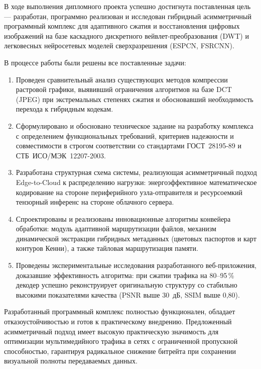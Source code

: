
В ходе выполнения дипломного проекта успешно достигнута поставленная цель — разработан, программно реализован и исследован гибридный асимметричный программный комплекс для адаптивного сжатия и восстановления цифровых изображений на базе каскадного дискретного вейвлет-преобразования (DWT) и легковесных нейросетевых моделей сверхразрешения (ESPCN, FSRCNN).

В процессе работы были решены все поставленные задачи:
\begin{enumerate}
    \item Проведен сравнительный анализ существующих методов компрессии растровой графики, выявивший ограничения алгоритмов на базе DCT (JPEG) при экстремальных степенях сжатия и обосновавший необходимость перехода к гибридным кодекам.
    \item Сформулировано и обосновано техническое задание на разработку комплекса с определением функциональных требований, критериев надежности и совместимости в строгом соответствии со стандартами ГОСТ~28195-89 и СТБ~ИСО/МЭК~12207-2003.
    \item Разработана структурная схема системы, реализующая асимметричный подход Edge-to-Cloud к распределению нагрузки: энергоэффективное математическое кодирование на стороне периферийного узла-отправителя и ресурсоемкий тензорный инференс на стороне облачного сервера.
    \item Спроектированы и реализованы инновационные алгоритмы конвейера обработки: модуль адаптивной маршрутизации файлов, механизм динамической экстракции гибридных метаданных (цветовых паспортов и карт контуров Кенни), а также тайловая маршрутизация памяти.
    \item Проведены экспериментальные исследования разработанного веб-приложения, доказавшие эффективность алгоритма: при сжатии трафика на 80–95\,\% декодер успешно реконструирует оригинальную структуру со стабильно высокими показателями качества (PSNR выше 30~дБ, SSIM выше 0,80).
\end{enumerate}

Разработанный программный комплекс полностью функционален, обладает отказоустойчивостью и готов к практическому внедрению. Предложенный асимметричный подход имеет высокую практическую значимость для оптимизации мультимедийного трафика в сетях с ограниченной пропускной способностью, гарантируя радикальное снижение битрейта при сохранении визуальной полноты передаваемых данных.